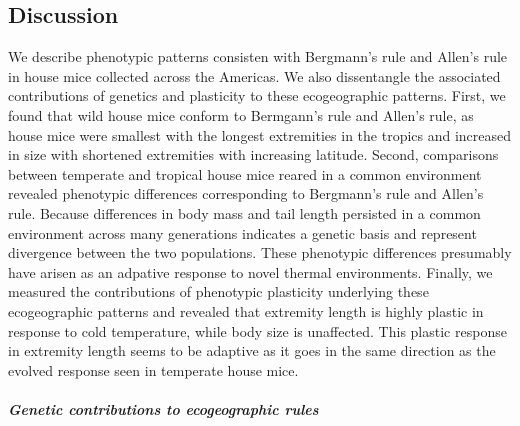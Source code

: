 \documentclass[]{article}
\let\oldsubparagraph\subparagraph
\renewcommand{\subparagraph}[1]{\oldsubparagraph{#1}\mbox{}}
\begin{document}
\newpage

\hypertarget{discussion}{%
\subsection{Discussion}\label{discussion}}

We describe phenotypic patterns consisten with Bergmann's rule and
Allen's rule in house mice collected across the Americas. We also
dissentangle the associated contributions of genetics and plasticity to
these ecogeographic patterns. First, we found that wild house mice
conform to Bermgann's rule and Allen's rule, as house mice were smallest
with the longest extremities in the tropics and increased in size with
shortened extremities with increasing latitude. Second, comparisons
between temperate and tropical house mice reared in a common environment
revealed phenotypic differences corresponding to Bergmann's rule and
Allen's rule. Because differences in body mass and tail length persisted
in a common environment across many generations indicates a genetic
basis and represent divergence between the two populations. These
phenotypic differences presumably have arisen as an adpative response to
novel thermal environments. Finally, we measured the contributions of
phenotypic plasticity underlying these ecogeographic patterns and
revealed that extremity length is highly plastic in response to cold
temperature, while body size is unaffected. This plastic response in
extremity length seems to be adaptive as it goes in the same direction
as the evolved response seen in temperate house mice.

\hypertarget{genetic-contributions-to-ecogeographic-rules}{%
\subparagraph{\texorpdfstring{\emph{Genetic contributions to
ecogeographic
rules}}{Genetic contributions to ecogeographic rules}}\label{genetic-contributions-to-ecogeographic-rules}}
\end{document}
